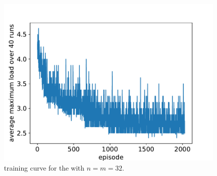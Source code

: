 \begin{figure}[ht] 
    \centering
    \includegraphics[scale=0.6]{Chapter4/Figs/training_progression_hypercube_32_32.pdf}
    \caption{\GraphicalTwoChoice training curve for the \CycleGraph with $n=m=32$.}
    \label{graphical-two-choice-training-curve}
\end{figure}

